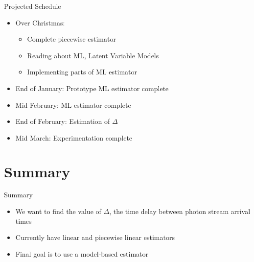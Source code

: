 \documentclass{beamer}
\begin{document}
\begin{frame}{Projected Schedule}
  \begin{itemize}
  \item  Over Christmas: 
    \begin{itemize}
    \item Complete piecewise estimator
    \item Reading about ML, Latent Variable Models
    \item Implementing parts of ML estimator
    \end{itemize}
  \item End of January: Prototype ML estimator complete
  \item Mid February: ML estimator complete
  \item End of February: Estimation of $\Delta$
  \item Mid March: Experimentation complete
  \end{itemize}
\end{frame}


\section*{Summary}

\begin{frame}{Summary}

  \begin{itemize}
  \item
    We want to find the value of $\Delta$, the time delay between photon stream arrival times
  \item
    Currently have linear and piecewise linear estimators
  \item
    Final goal is to use a model-based estimator
  \end{itemize}
\end{frame}
\end{document}
